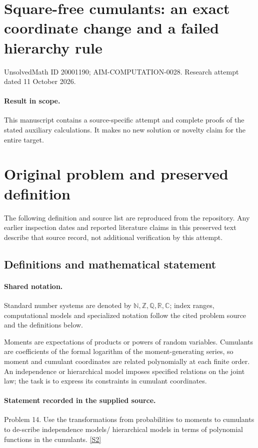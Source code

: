 \documentclass[11pt]{article}
\begin{document}
\section*{Square-free cumulants: an exact coordinate change and a failed hierarchy rule}
\noindent UnsolvedMath ID 20001190; AIM-COMPUTATION-0028. Research attempt dated 11 October 2026.
\paragraph{Result in scope.}This manuscript contains a source-specific attempt and complete proofs of the stated auxiliary calculations. It makes no new solution or novelty claim for the entire target.
\section{Original problem and preserved definition}
The following definition and source list are reproduced from the repository. Any earlier inspection dates and reported literature claims in this preserved text describe that source record, not additional verification by this attempt.
\subsection{Definitions and mathematical statement}

\paragraph{Shared notation.}Standard number systems are denoted by $\mathbb N,\mathbb Z,\mathbb Q,\mathbb R,\mathbb C$; index ranges, computational models and specialized notation follow the cited problem source and the definitions below.


Moments are expectations of products or powers of random variables. Cumulants are coefficients of the formal logarithm of the moment-generating series, so moment and cumulant coordinates are related polynomially at each finite order. An independence or hierarchical model imposes specified relations on the joint law; the task is to express its constraints in cumulant coordinates.
\paragraph{Statement recorded in the supplied source.}
Problem 14. Use the transformations from probabilities to moments to cumulants to de-scribe independence models/ hierarchical models in terms of polynomial functions in the cumulants. \href{https://aimath.org/WWN/compalgstat/compalgstat.pdf}{[S2]}
\end{document}
